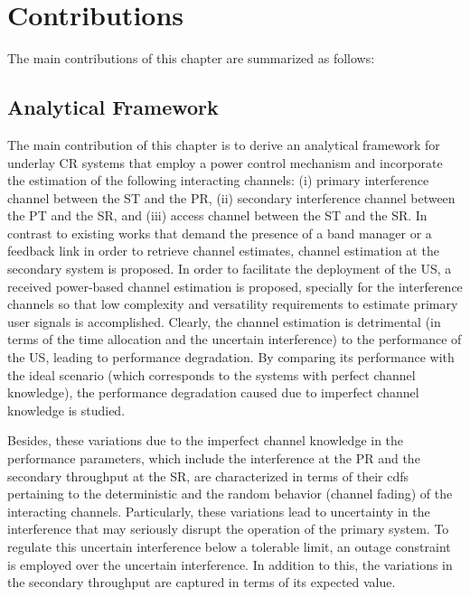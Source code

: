 \section{Contributions}
The main contributions of this chapter are summarized as follows: 
\subsection{Analytical Framework}
The main contribution of this chapter is to derive an analytical framework for underlay CR systems that employ a power control mechanism and incorporate the estimation of the following interacting channels: (i) primary interference channel between the ST and the PR, (ii) secondary interference channel between the PT and the SR, and (iii) access channel between the ST and the SR. In contrast to existing works that demand the presence of a band manager or a feedback link in order to retrieve channel estimates, channel estimation at the secondary system is proposed. In order to facilitate the deployment of the US, a received power-based channel estimation is proposed, specially for the interference channels so that low complexity and versatility requirements to estimate primary user signals is accomplished. Clearly, the channel estimation is detrimental (in terms of the time allocation and the uncertain interference) to the performance of the US, leading to performance degradation. By comparing its performance with the ideal scenario (which corresponds to the systems with perfect channel knowledge), the performance degradation caused due to imperfect channel knowledge is studied. 

Besides, these variations due to the imperfect channel knowledge in the performance parameters, which include the interference at the PR and the secondary throughput at the SR, are characterized in terms of their cdfs pertaining to the deterministic  and the random behavior (channel fading) of the interacting channels. Particularly, these variations lead to uncertainty in the interference that may seriously disrupt the operation of the primary system. To regulate this uncertain interference below a tolerable limit, an outage constraint is employed over the uncertain interference. In addition to this, the variations in the secondary throughput are captured in terms of its expected value.

